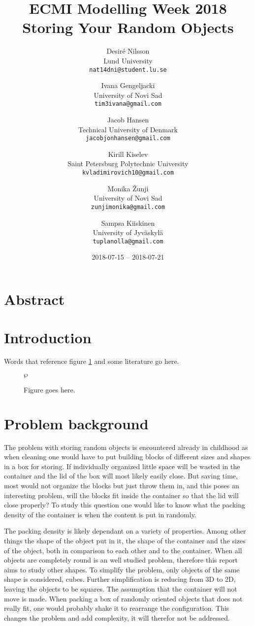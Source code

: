 \documentclass[draft, 12pt, sumlimits, intlimits]{article}
\title{ECMI Modelling Week 2018 \\ Storing Your Random Objects}
\author{Desiré Nilsson \\ Lund University \\
\texttt{nat14dni@student.lu.se} \and
Ivana Gengeljacki \\ University of Novi Sad \\
\texttt{tim3ivana@gmail.com} \and
Jacob Hansen \\ Technical University of Denmark \\
\texttt{jacobjonhansen@gmail.com} \and
Kirill Kiselev \\ Saint Petersburg Polytechnic University \\
\texttt{kvladimirovich10@gmail.com} \and
Monika Žunji \\ University of Novi Sad \\
\texttt{zunjimonika@gmail.com} \and
Sampsa Kiiskinen \\ University of Jyväskylä \\
\texttt{tuplanolla@gmail.com}}
\date{2018-07-15 -- 2018-07-21}
\begin{document}
\maketitle

\section*{Abstract}

\section{Introduction}

Words that reference figure \ref{f/stuff} and
some literature \cite{conway-1998} go here.

\begin{figure}
  \centering
  $\wp$ %
  \caption{Figure goes here.}
  \label{f/stuff}
\end{figure}

\section{Problem background}
The problem with storing random objects is encountered already in childhood as when cleaning one would have to put building blocks of different sizes and shapes in a box for storing. If individually organized little space will be wasted in the container and the lid of the box will most likely easily close. But saving time, most would not organize the blocks but just throw them in, and this poses an interesting problem, will the blocks fit inside the container so that the lid will close properly?
To study this question one would like to know what the packing density of the container is when the content is put in randomly.

The packing density is likely dependant on a variety of properties. Among other things the shape of the object put in it, the shape of the container and the sizes of the object, both in comparison to each other and to the container. When all objects are completely round is an well studied problem, therefore this report aims to study other shapes.
To simplify the problem, only objects of the same shape is considered, cubes. Further simplification is reducing from 3D to 2D, leaving the objects to be squares.
The assumption that the container will not move is made. When packing a box of randomly oriented objects that does not really fit, one would probably shake it to rearrange the configuration. This changes the problem and add complexity, it will therefor not be addressed.
\end{document}
